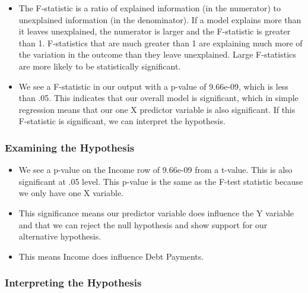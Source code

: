 \documentclass[
  letterpaper,
  DIV=11,
  numbers=noendperiod]{scrreprt}
\providecommand{\tightlist}{%
  \setlength{\itemsep}{0pt}\setlength{\parskip}{0pt}}\usepackage{longtable,booktabs,array}
\begin{document}
\begin{itemize}
\tightlist
\item
  The F-statistic is a ratio of explained information (in the numerator)
  to unexplained information (in the denominator). If a model explains
  more than it leaves unexplained, the numerator is larger and the
  F-statistic is greater than 1. F-statistics that are much greater than
  1 are explaining much more of the variation in the outcome than they
  leave unexplained. Large F-statistics are more likely to be
  statistically significant.
\item
  We see a F-statistic in our output with a p-value of 9.66e-09, which
  is less than .05. This indicates that our overall model is
  significant, which in simple regression means that our one X predictor
  variable is also significant. If this F-statistic is significant, we
  can interpret the hypothesis.
\end{itemize}

\subsubsection{Examining the Hypothesis}\label{examining-the-hypothesis}

\begin{itemize}
\tightlist
\item
  We see a p-value on the Income row of 9.66e-09 from a t-value. This is
  also significant at .05 level. This p-value is the same as the F-test
  statistic because we only have one X variable.
\item
  This significance means our predictor variable does influence the Y
  variable and that we can reject the null hypothesis and show support
  for our alternative hypothesis.
\item
  This means Income does influence Debt Payments.
\end{itemize}

\subsubsection{Interpreting the
Hypothesis}\label{interpreting-the-hypothesis}
\end{document}
